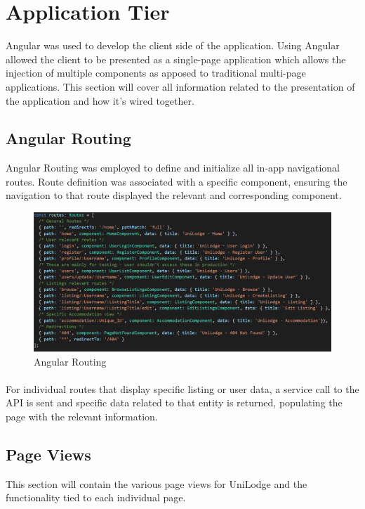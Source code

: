 \section{Application Tier}
Angular was used to develop the client side of the application. Using Angular allowed the client to be presented as a single-page application which allows the injection of multiple components as apposed to traditional multi-page applications. This section will cover all information related to the presentation of the application and how it's wired together.

\subsection{Angular Routing}
Angular Routing was employed to define and initialize all in-app navigational routes. Route definition was associated with a specific component, ensuring the navigation to that route displayed the relevant and corresponding component.

\begin{figure}[H]
	\caption{Angular Routing}
	\label{image:routing}
	\centering
	\includegraphics[width=1\textwidth]{images/routes.png}
\end{figure}

\paragraph{}
For individual routes that display specific listing or user data, a service call to the API is sent and specific data related to that entity is returned, populating the page with the relevant information.



\subsection{Page Views}
This section will contain the various page views for UniLodge and the functionality tied to each individual page.

